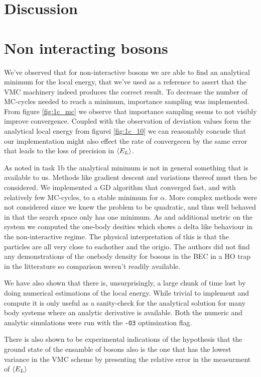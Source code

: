 \section{Discussion}
\section{Non interacting bosons}

We've observed that for non-interactive bosons we are able to find an analytical minimum for the local energy, that we've used as a reference to assert that the VMC machinery indeed produces the correct result. 
To decrease the number of MC-cycles needed to reach a minimum, importance sampling was implemented. 
From figure \ref{fig:1c_mc} we observe that importance sampling seems to not visibly improve convergence. 
Coupled with the observation of deviation values form the analytical local energy from figurei \ref{fig:1c_10}
we can reasonably concude that our implementation might also effect  the rate of convergecen by the same error that leads to the loss of precision in $\langle E_L \rangle$.

As noted in task 1b the analytical minimum is not in general something that is available to us.
Methods like gradient descent and variations thereof must then be considered. We implemented a GD algorithm that converged fast, and with relatively few MC-cycles, to a stable minimum for $\alpha$. More complex methods were not considered since we knew the problem to be quadratic, and thus well behaved in that the search space only has one minimum. 
As and additional metric on the system we computed the one-body desities which shows a delta like behaviour in the non-interactive regime. The physical interpretation of this is that the particles are all very close to eachother and the origio. The authors did not find any demonstrations of the onebody density for bosons in the BEC in a HO trap in the litterature so comparison weren't readily available. 

We have also shown that there is, unsurprisingly, a large chunk of time lost by doing numerical estimations of the local energy. While trivial to implement and compute it is only useful as a sanity-check for the analytical solution for many body systems where an analytic derivative is available. Both the numeric and analytic simulations were run with the \lstinline{-O3} optimization flag. 

There is also shown to be experimental indications of the hypothesis that the ground state of the ensamble of bosons also is  the one that has the lowest variance in the VMC scheme by presenting the relative error in the measurment of $\langle E_L \rangle$  


